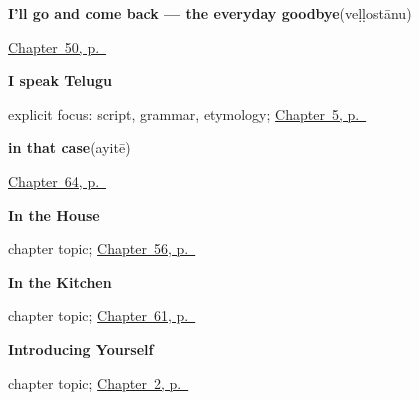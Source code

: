\noindent\begin{minipage}[t]{\linewidth}
\raggedright
\textbf{I'll go and come back --- the everyday goodbye}\enspace\emph{}\enspace(veḷḷostānu)\par
\footnotesize \hyperref[ch:te-leave-more]{Chapter~50, p.~\pageref*{ch:te-leave-more}}
\end{minipage}\par\smallskip

\noindent\begin{minipage}[t]{\linewidth}
\raggedright
\textbf{I speak Telugu}\enspace\emph{  }\par
\footnotesize explicit focus: script, grammar, etymology; \hyperref[ch:first-verbs]{Chapter~5, p.~\pageref*{ch:first-verbs}}
\end{minipage}\par\smallskip

\noindent\begin{minipage}[t]{\linewidth}
\raggedright
\textbf{in that case}\enspace\emph{}\enspace(ayitē)\par
\footnotesize \hyperref[ch:te-joining-words]{Chapter~64, p.~\pageref*{ch:te-joining-words}}
\end{minipage}\par\smallskip

\noindent\begin{minipage}[t]{\linewidth}
\raggedright
\textbf{In the House}\par
\footnotesize chapter topic; \hyperref[ch:te-house]{Chapter~56, p.~\pageref*{ch:te-house}}
\end{minipage}\par\smallskip

\noindent\begin{minipage}[t]{\linewidth}
\raggedright
\textbf{In the Kitchen}\par
\footnotesize chapter topic; \hyperref[ch:te-kitchen]{Chapter~61, p.~\pageref*{ch:te-kitchen}}
\end{minipage}\par\smallskip

\noindent\begin{minipage}[t]{\linewidth}
\raggedright
\textbf{Introducing Yourself}\par
\footnotesize chapter topic; \hyperref[ch:introductions]{Chapter~2, p.~\pageref*{ch:introductions}}
\end{minipage}\par\smallskip

